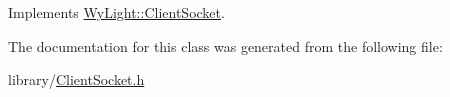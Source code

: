 Implements \hyperlink{class_wy_light_1_1_client_socket_ab5ea6d042caa7f624015d514263ab6b5}{Wy\-Light\-::\-Client\-Socket}.



The documentation for this class was generated from the following file\-:\begin{DoxyCompactItemize}
\item 
library/\hyperlink{_client_socket_8h}{Client\-Socket.\-h}\end{DoxyCompactItemize}
